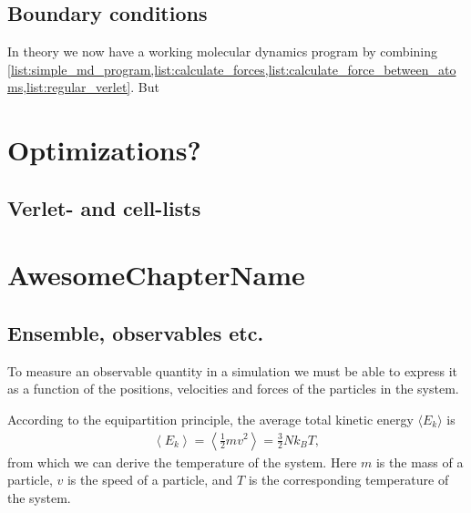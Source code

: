 \section{Boundary conditions}
In theory we now have a working molecular dynamics program by combining \cref{list:simple_md_program,list:calculate_forces,list:calculate_force_between_atoms,list:regular_verlet}. But 










\chapter{Optimizations?}

\section{Verlet- and cell-lists}
    













\chapter{AwesomeChapterName}

\section{Ensemble, observables etc.}


To measure an observable quantity in a simulation we must be able to express it as a function of the positions, velocities and forces of the particles in the system. 

According to the equipartition principle, the average total kinetic energy $\langle E_k \rangle$ is
\begin{align*}
    \left\langle E_k \right\rangle = \left\langle \frac{1}{2}mv^2 \right\rangle = \frac{3}{2}Nk_B T,
\end{align*}
from which we can derive the temperature of the system. Here $m$ is the mass of a particle, $v$ is the speed of a particle, and $T$ is the corresponding temperature of the system.

